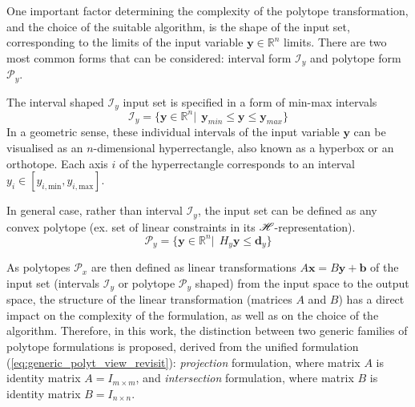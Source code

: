 
One important factor determining the complexity of the polytope transformation, and the choice of the suitable algorithm, is the shape of the input set, corresponding to the limits of the input variable $\bm{y}\in\mathbb{R}^n$ limits. There are two most common forms that can be considered: interval form $\mathcal{I}_y$ and polytope form $\mathcal{P}_y$. 

The interval shaped $\mathcal{I}_y$ input set is specified in a form of min-max intervals
\begin{equation}
    \mathcal{I}_y = \{\bm{y}\in \mathbb{R}^n |~~ \bm{y}_{min} \leq \bm{y}\leq \bm{y}_{max} \}
    \label{eq:hypercube_lim}
\end{equation}
In a geometric sense, these individual intervals of the input variable $\bm{y}$ can be visualised as an $n$-dimensional hyperrectangle, also known as a hyperbox or an orthotope. Each axis $i$ of the hyperrectangle corresponds to an interval $y_i\in[y_{i,\text{min}},y_{i,\text{max}}]$.

In general case, rather than interval $\mathcal{I}_y$, the input set can be defined as any convex polytope (ex. set of linear constraints in its $\mathscr{H}$-representation).
\begin{equation}
    \mathcal{P}_y = \{\bm{y}\in \mathbb{R}^n|~~ H_y\bm{y}\leq \bm{d}_y \}
\end{equation}

As polytopes $\mathcal{P}_x$ are then defined as linear transformations $A\bm{x}\!=\!B\bm{y}\! +\! \bm{b}$ of the input set (intervals $\mathcal{I}_y$ or polytope $\mathcal{P}_y$ shaped) from the input space to the output space, the structure of the linear transformation (matrices $A$ and $B$) has a direct impact on the complexity of the formulation, as well as on the choice of the algorithm.
Therefore, in this work, the distinction between two generic families of polytope formulations is proposed, derived from the unified formulation (\ref{eq:generic_polyt_view_revisit}): \textit{projection} formulation, where matrix $A$ is identity matrix $A=I_{m\times m}$, and \textit{intersection} formulation, where matrix $B$ is identity matrix $B=I_{n\times n}$.

